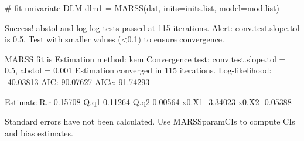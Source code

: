 \begin{Schunk}
\begin{Sinput}
 # fit univariate DLM
 dlm1 = MARSS(dat, inits=inits.list, model=mod.list)
\end{Sinput}
\begin{Soutput}
Success! abstol and log-log tests passed at 115 iterations.
Alert: conv.test.slope.tol is 0.5.
Test with smaller values (<0.1) to ensure convergence.

MARSS fit is
Estimation method: kem 
Convergence test: conv.test.slope.tol = 0.5, abstol = 0.001
Estimation converged in 115 iterations. 
Log-likelihood: -40.03813 
AIC: 90.07627   AICc: 91.74293   
 
      Estimate
R.r    0.15708
Q.q1   0.11264
Q.q2   0.00564
x0.X1 -3.34023
x0.X2 -0.05388

Standard errors have not been calculated. 
Use MARSSparamCIs to compute CIs and bias estimates.
\end{Soutput}
\end{Schunk}
